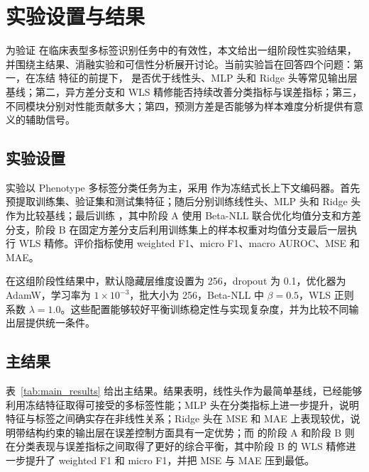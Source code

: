 \section{实验设置与结果}
为验证 \method{} 在临床表型多标签识别任务中的有效性，本文给出一组阶段性实验结果，并围绕主结果、消融实验和可信性分析展开讨论。当前实验旨在回答四个问题：第一，在冻结 \encoder{} 特征的前提下，\method{} 是否优于线性头、MLP 头和 Ridge 头等常见输出层基线；第二，异方差分支和 WLS 精修能否持续改善分类指标与误差指标；第三，不同模块分别对性能贡献多大；第四，预测方差是否能够为样本难度分析提供有意义的辅助信号。

\subsection{实验设置}
实验以 Phenotype 多标签分类任务为主，采用 \encoder{} 作为冻结式长上下文编码器。首先预提取训练集、验证集和测试集特征；随后分别训练线性头、MLP 头和 Ridge 头作为比较基线；最后训练 \method{}，其中阶段 A 使用 Beta-NLL 联合优化均值分支和方差分支，阶段 B 在固定方差分支后利用训练集上的样本权重对均值分支最后一层执行 WLS 精修。评价指标使用 weighted F1、micro F1、macro AUROC、MSE 和 MAE。

在这组阶段性结果中，默认隐藏层维度设置为 256，dropout 为 0.1，优化器为 AdamW，学习率为 $1\times10^{-3}$，批大小为 256，Beta-NLL 中 $\beta=0.5$，WLS 正则系数 $\lambda=1.0$。这些配置能够较好平衡训练稳定性与实现复杂度，并为比较不同输出层提供统一条件。

\subsection{主结果}
表~\ref{tab:main_results} 给出主结果。结果表明，线性头作为最简单基线，已经能够利用冻结特征取得可接受的多标签性能；MLP 头在分类指标上进一步提升，说明特征与标签之间确实存在非线性关系；Ridge 头在 MSE 和 MAE 上表现较优，说明带结构约束的输出层在误差控制方面具有一定优势；而 \method{} 的阶段 A 和阶段 B 则在分类表现与误差指标之间取得了更好的综合平衡，其中阶段 B 的 WLS 精修进一步提升了 weighted F1 和 micro F1，并把 MSE 与 MAE 压到最低。

